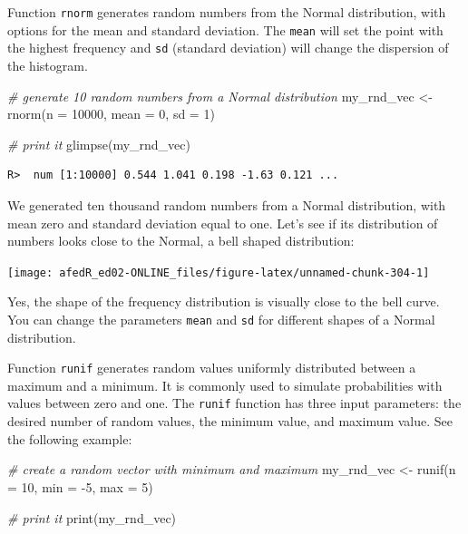 \documentclass[
  12pt,
]{book}
\newenvironment{Shaded}{\begin{snugshade}}{\end{snugshade}}
\newcommand{\AttributeTok}[1]{\textcolor[rgb]{0.61,0.61,0.61}{#1}}
\newcommand{\CommentTok}[1]{\textcolor[rgb]{0.37,0.37,0.37}{\textit{#1}}}
\newcommand{\DecValTok}[1]{\textcolor[rgb]{0.06,0.06,0.06}{#1}}
\newcommand{\FunctionTok}[1]{\textcolor[rgb]{0,0,0}{#1}}
\newcommand{\NormalTok}[1]{#1}
\newcommand{\OtherTok}[1]{\textcolor[rgb]{0.37,0.37,0.37}{#1}}
\newcommand{\SpecialCharTok}[1]{\textcolor[rgb]{0,0,0}{#1}}
\begin{document}
Function \texttt{rnorm} generates random numbers from the Normal distribution, with options for the mean and standard deviation. The \texttt{mean} will set the point with the highest frequency and \texttt{sd} (standard deviation) will change the dispersion of the histogram.

\begin{Shaded}
\begin{Highlighting}[]
\CommentTok{\# generate 10 random numbers from a Normal distribution}
\NormalTok{my\_rnd\_vec }\OtherTok{\textless{}{-}} \FunctionTok{rnorm}\NormalTok{(}\AttributeTok{n =} \DecValTok{10000}\NormalTok{, }
                    \AttributeTok{mean =} \DecValTok{0}\NormalTok{, }
                    \AttributeTok{sd =} \DecValTok{1}\NormalTok{)}

\CommentTok{\# print it}
\FunctionTok{glimpse}\NormalTok{(my\_rnd\_vec)}
\end{Highlighting}
\end{Shaded}

\begin{verbatim}
R>  num [1:10000] 0.544 1.041 0.198 -1.63 0.121 ...
\end{verbatim}

We generated ten thousand random numbers from a Normal distribution, with mean zero and standard deviation equal to one. Let's see if its distribution of numbers looks close to the Normal, a bell shaped distribution:

\begin{center}\texttt{[image: afedR\_ed02-ONLINE\_files/figure-latex/unnamed-chunk-304-1]} \end{center}

Yes, the shape of the frequency distribution is visually close to the bell curve. You can change the parameters \texttt{mean} and \texttt{sd} for different shapes of a Normal distribution.

Function \texttt{runif} generates random values uniformly distributed between a maximum and a minimum. It is commonly used to simulate probabilities with values between zero and one. The \texttt{runif} function has three input parameters: the desired number of random values, the minimum value, and maximum value. See the following example:

\begin{Shaded}
\begin{Highlighting}[]
\CommentTok{\# create a random vector with minimum and maximum}
\NormalTok{my\_rnd\_vec }\OtherTok{\textless{}{-}} \FunctionTok{runif}\NormalTok{(}\AttributeTok{n =} \DecValTok{10}\NormalTok{, }
                    \AttributeTok{min =} \SpecialCharTok{{-}}\DecValTok{5}\NormalTok{, }
                    \AttributeTok{max =} \DecValTok{5}\NormalTok{)}

\CommentTok{\# print it}
\FunctionTok{print}\NormalTok{(my\_rnd\_vec)}
\end{Highlighting}
\end{Shaded}
\end{document}
